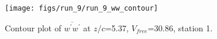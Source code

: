 \begin{figure}[H]
\centering
\texttt{[image: figs/run\_9/run\_9\_ww\_contour]}
\caption{Contour plot of $\overline{w^\prime w^\prime}$ at $z/c$=5.37, $V_{free}$=30.86, station 1.}
\label{fig:run_9_ww_contour}
\end{figure}


